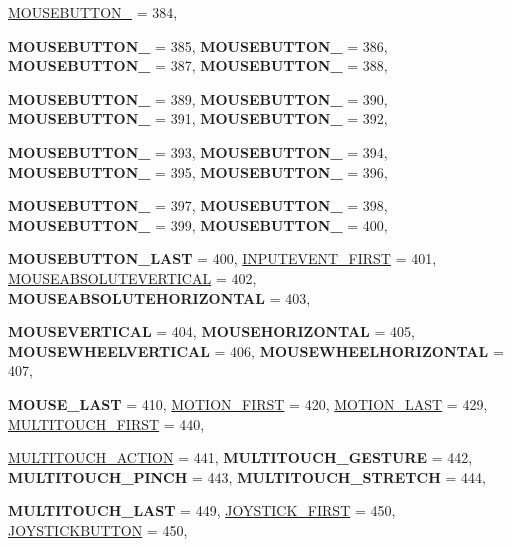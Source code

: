 \begin{DoxyCompactItemize}
\hyperlink{classphys_1_1MetaCode_a3e501cbb5bf0f6f1fdb7211465bda8d8a381661a06de4ddc52f127d08e8fa2172}{MOUSEBUTTON\_} =  384, 
\par
{\bfseries MOUSEBUTTON\_} =  385, 
{\bfseries MOUSEBUTTON\_} =  386, 
{\bfseries MOUSEBUTTON\_} =  387, 
{\bfseries MOUSEBUTTON\_} =  388, 
\par
{\bfseries MOUSEBUTTON\_} =  389, 
{\bfseries MOUSEBUTTON\_} =  390, 
{\bfseries MOUSEBUTTON\_} =  391, 
{\bfseries MOUSEBUTTON\_} =  392, 
\par
{\bfseries MOUSEBUTTON\_} =  393, 
{\bfseries MOUSEBUTTON\_} =  394, 
{\bfseries MOUSEBUTTON\_} =  395, 
{\bfseries MOUSEBUTTON\_} =  396, 
\par
{\bfseries MOUSEBUTTON\_} =  397, 
{\bfseries MOUSEBUTTON\_} =  398, 
{\bfseries MOUSEBUTTON\_} =  399, 
{\bfseries MOUSEBUTTON\_} =  400, 
\par
{\bfseries MOUSEBUTTON\_\-LAST} =  400, 
\hyperlink{classphys_1_1MetaCode_a3e501cbb5bf0f6f1fdb7211465bda8d8a87685f9ca9462b329f2b86a17514f136}{INPUTEVENT\_\-FIRST} =  401, 
\hyperlink{classphys_1_1MetaCode_a3e501cbb5bf0f6f1fdb7211465bda8d8ac65e76437da2f60b775aed6acf84a42a}{MOUSEABSOLUTEVERTICAL} =  402, 
{\bfseries MOUSEABSOLUTEHORIZONTAL} =  403, 
\par
{\bfseries MOUSEVERTICAL} =  404, 
{\bfseries MOUSEHORIZONTAL} =  405, 
{\bfseries MOUSEWHEELVERTICAL} =  406, 
{\bfseries MOUSEWHEELHORIZONTAL} =  407, 
\par
{\bfseries MOUSE\_\-LAST} =  410, 
\hyperlink{classphys_1_1MetaCode_a3e501cbb5bf0f6f1fdb7211465bda8d8a355649b334e903ada2496ad39dcd5f9d}{MOTION\_\-FIRST} =  420, 
\hyperlink{classphys_1_1MetaCode_a3e501cbb5bf0f6f1fdb7211465bda8d8a59cc92f5b2f42f7a138f8ea22e92d626}{MOTION\_\-LAST} =  429, 
\hyperlink{classphys_1_1MetaCode_a3e501cbb5bf0f6f1fdb7211465bda8d8acdb03d23d93022d5962db5026475b9c7}{MULTITOUCH\_\-FIRST} =  440, 
\par
\hyperlink{classphys_1_1MetaCode_a3e501cbb5bf0f6f1fdb7211465bda8d8a94d804dc2330be620a8009252b5d5d22}{MULTITOUCH\_\-ACTION} =  441, 
{\bfseries MULTITOUCH\_\-GESTURE} =  442, 
{\bfseries MULTITOUCH\_\-PINCH} =  443, 
{\bfseries MULTITOUCH\_\-STRETCH} =  444, 
\par
{\bfseries MULTITOUCH\_\-LAST} =  449, 
\hyperlink{classphys_1_1MetaCode_a3e501cbb5bf0f6f1fdb7211465bda8d8a666e564cae666de739b9b3cf047ec578}{JOYSTICK\_\-FIRST} =  450, 
\hyperlink{classphys_1_1MetaCode_a3e501cbb5bf0f6f1fdb7211465bda8d8aaaa2af6a60a9cd7403aa4786ef1ea389}{JOYSTICKBUTTON} =  450, 

\end{DoxyCompactItemize}
